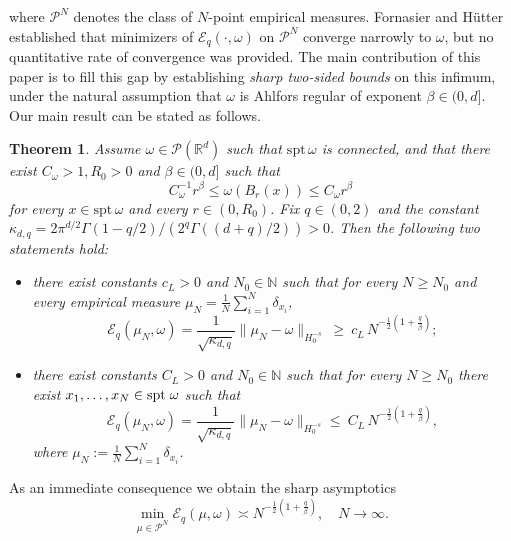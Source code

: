 \documentclass[12pt,a4paper,oneside]{amsart}
\theoremstyle{plain}
\newtheorem{theorem}{Theorem}[section]
\theoremstyle{definition}
\numberwithin{equation}{section}
\numberwithin{figure}{section}
\numberwithin{table}{section}
\theoremstyle{remark}
\newcommand{\R}{\mathbb{R}}
\newcommand{\N}{\mathbb{N}}
\newcommand{\expAhlfors}{\beta}
\begin{document}
where $\mathcal{P}^N$ denotes the class of $N$-point empirical measures. Fornasier and H\"utter \cite{fornasier2014consistency} established that minimizers of $\mathcal{E}_q(\cdot,\omega)$ on $\mathcal P^N$ converge narrowly to $\omega$, but no quantitative rate of convergence was provided. The main contribution of this paper is to fill this gap by establishing \emph{sharp two-sided bounds} on this infimum, under the natural assumption that $\omega$ is Ahlfors regular of exponent $\beta\in(0,d]$. Our main result can be stated as follows.
% 
\begin{theorem}\label{t:main-intro}
Assume $\omega\in \mathcal{P}(\R^d)$ such that $\mathrm{spt}\, \omega$ is connected, and that there exist $C_\omega > 1,R_0>0$ and $\expAhlfors\in(0,d]$ such that 
\begin{equation}\label{e:alfhors reg0}
C^{-1}_\omega r^\expAhlfors \leq \omega(B_r(x)) \leq C_\omega r^\expAhlfors 
\end{equation}
for every $x\in \mathrm{spt}\, \omega$ and every $r\in (0,R_0)$. Fix $q\in (0,2)$ and the constant $\kappa_{d,q} = 2\pi^{d/2}\Gamma(1-q/2)/(2^q\Gamma((d+q)/2))>0$. Then the following two statements hold:
\begin{itemize}
  \item[(i)]   there exist constants $c_L>0$ and $N_0\in\N$ such that for every $N\ge N_0$ and every empirical measure $\mu_N=\frac1N\sum_{i=1}^N\delta_{x_i}$,
\begin{equation}\label{eq:Hdots-lower0}
\mathcal{E}_q(\mu_N,\omega) = \frac{1}{\sqrt{\kappa_{d,q}}}\|\mu_N-\omega\|_{H_0^{-s}} \ \ge\ c_L\,N^{-\frac{1}{2}(1+\frac{q}{\expAhlfors})};
\end{equation}
\item[(ii)]   there exist constants $C_L > 0$ and $N_0 \in \mathbb{N}$ such that for every $N\geq N_0$ there exist $x_1,\dots,x_N \in \textup{spt} \; \omega$ such that 
\begin{equation}\label{e:upper-bound-main}
\mathcal{E}_q(\mu_N,\omega) = \frac{1}{\sqrt{\kappa_{d,q}}}\|\mu_N-\omega\|_{H_0^{-s}}\le\ C_L\,N^{-\frac{1}{2}(1+\frac{q}{\expAhlfors})},
\end{equation}
where ${\mu_N}:=\frac1N\sum_{i=1}^N \delta_{x_i}$.
\end{itemize}
\end{theorem}
% 
As an immediate consequence we obtain the sharp asymptotics
\begin{equation*}
\min_{\mu \in \mathcal P^N} \mathcal{E}_q(\mu,\omega)  \asymp N^{-\frac{1}{2}(1+\frac{q}{\expAhlfors})}, \quad N \to \infty.
\end{equation*}
\end{document}
